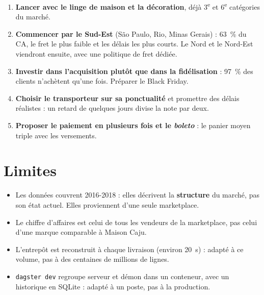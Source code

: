 \documentclass[11pt, a4paper, oneside, headings=normal, numbers=noenddot, DIV=12]{scrartcl}
\begin{document}
\begin{keybox}
\begin{enumerate}[leftmargin=1.4em]
  \item \textbf{Lancer avec le linge de maison et la décoration}, déjà 3\textsuperscript{e} et 6\textsuperscript{e} catégories du marché.
  \item \textbf{Commencer par le Sud-Est} (São Paulo, Rio, Minas Gerais) : 63~\% du CA, le fret le plus faible et les délais les plus courts.
        Le Nord et le Nord-Est viendront ensuite, avec une politique de fret dédiée.
  \item \textbf{Investir dans l'acquisition plutôt que dans la fidélisation} : 97~\% des clients n'achètent qu'une fois. Préparer le Black Friday.
  \item \textbf{Choisir le transporteur sur sa ponctualité} et promettre des délais réalistes : un retard de quelques jours divise la note par deux.
  \item \textbf{Proposer le paiement en plusieurs fois et le \emph{boleto}} : le panier moyen triple avec les versements.
\end{enumerate}
\end{keybox}

\section{Limites}
\begin{itemize}[leftmargin=1.2em]
  \item Les données couvrent 2016-2018 : elles décrivent la \textbf{structure} du marché, pas son état actuel. Elles proviennent d'une seule marketplace.
  \item Le chiffre d'affaires est celui de tous les vendeurs de la marketplace, pas celui d'une marque comparable à Maison Caju.
  \item L'entrepôt est reconstruit à chaque livraison (environ 20~s) : adapté à ce volume, pas à des centaines de millions de lignes.
  \item \texttt{dagster dev} regroupe serveur et démon dans un conteneur, avec un historique en SQLite : adapté à un poste, pas à la production.
\end{itemize}

\end{document}
